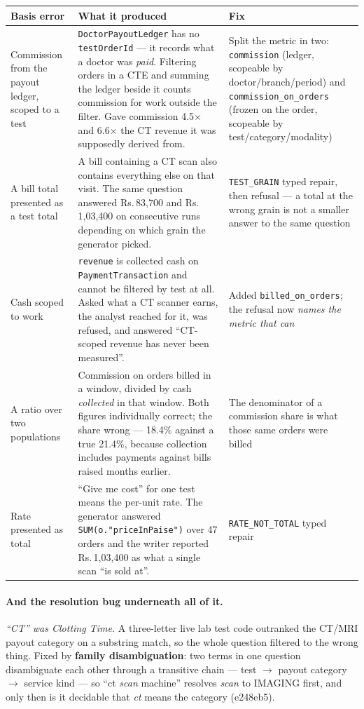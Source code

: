 \documentclass[11pt,a4paper]{report}
\newcommand{\rs}[1]{Rs.\,#1}
\newcommand{\code}[1]{\texttt{\small #1}}
\newcommand{\sha}[1]{{\ttfamily\small\color{slate}#1}}
\begin{document}
\begin{center}
\small
\begin{tabular}{@{}p{4.0cm}p{6.0cm}p{4.6cm}@{}}
\toprule
\textbf{Basis error} & \textbf{What it produced} & \textbf{Fix}\\
\midrule
Commission from the payout ledger, scoped to a test & \code{DoctorPayoutLedger} has no
 \code{testOrderId} --- it records what a doctor was \emph{paid}. Filtering orders in a CTE and
 summing the ledger beside it counts commission for work outside the filter. Gave commission
 4.5$\times$ and 6.6$\times$ the CT revenue it was supposedly derived from. & Split the metric in
 two: \code{commission} (ledger, scopeable by doctor/branch/period) and
 \code{commission\_on\_orders} (frozen on the order, scopeable by test/category/modality)\\
A bill total presented as a test total & A bill containing a CT scan also contains everything else
 on that visit. The same question answered \rs{83{,}700} and \rs{1{,}03{,}400} on consecutive runs
 depending on which grain the generator picked. & \code{TEST\_GRAIN} typed repair, then refusal ---
 a total at the wrong grain is not a smaller answer to the same question\\
Cash scoped to work & \code{revenue} is collected cash on \code{PaymentTransaction} and cannot be
 filtered by test at all. Asked what a CT scanner earns, the analyst reached for it, was refused,
 and answered ``CT-scoped revenue has never been measured''. & Added
 \code{billed\_on\_orders}; the refusal now \emph{names the metric that can}\\
A ratio over two populations & Commission on orders billed in a window, divided by cash
 \emph{collected} in that window. Both figures individually correct; the share wrong --- 18.4\%
 against a true 21.4\%, because collection includes payments against bills raised months earlier. &
 The denominator of a commission share is what those same orders were billed\\
Rate presented as total & ``Give me cost'' for one test means the per-unit rate. The generator
 answered \code{SUM(o."priceInPaise")} over 47 orders and the writer reported \rs{1{,}03{,}400} as
 what a single scan ``is sold at''. & \code{RATE\_NOT\_TOTAL} typed repair\\
\bottomrule
\end{tabular}
\end{center}

\paragraph{And the resolution bug underneath all of it.} \emph{``CT'' was Clotting Time.} A
three-letter live lab test code outranked the CT/MRI payout category on a substring match, so the
whole question filtered to the wrong thing. Fixed by \textbf{family disambiguation}: two terms in
one question disambiguate each other through a transitive chain --- test $\to$ payout category
$\to$ service kind --- so ``ct \emph{scan} machine'' resolves \emph{scan} to IMAGING first, and only
then is it decidable that \emph{ct} means the category (\sha{e248eb5}).
\end{document}
